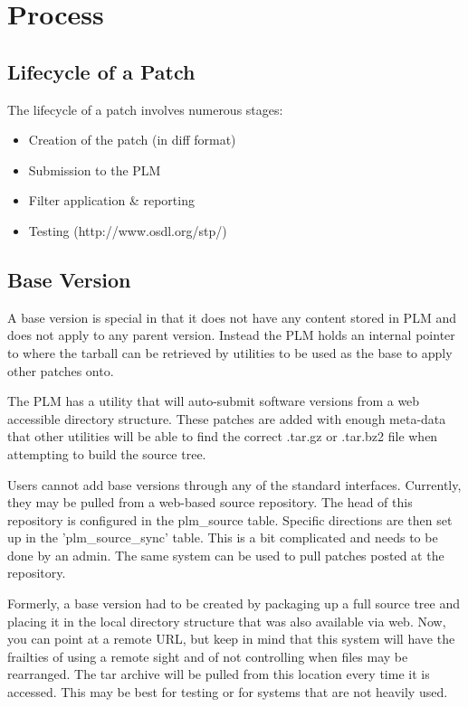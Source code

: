 \section{Process}
\subsection{Lifecycle of a Patch}
The lifecycle of a patch involves numerous stages:

\begin{itemize}
\item Creation of the patch (in diff format)
\item Submission to the PLM 
\item Filter application \& reporting
\item Testing (http://www.osdl.org/stp/)
\end{itemize}

\subsection{Base Version}
A base version is special in that it does not have any content stored in 
PLM and does not apply to any parent version.  Instead the PLM holds an 
internal pointer to where the tarball can be retrieved by utilities to be
used as the base to apply other patches onto.

The PLM has a utility that will auto-submit software versions from a web 
accessible directory structure.  These patches are added with enough 
meta-data that other utilities will be able to find the correct .tar.gz 
or .tar.bz2 file when attempting to build the source tree.

Users cannot add base versions through any of the standard interfaces.  
Currently, they may be pulled from a web-based source repository.  The 
head of this
repository is configured in the plm\_source table.  Specific directions
are then set up in the 'plm\_source\_sync' table.  This is a bit 
complicated and 
needs to be done by an admin.  The same system can be used to pull 
patches posted at the repository.

Formerly, a base version had to be created by packaging up a full source 
tree and placing it in the local directory structure that was also 
available via web.  Now, you can point at a remote URL, but keep in mind 
that this system will have the frailties of using a remote sight and 
of not controlling when files may be rearranged.  The tar archive will be 
pulled from this location every time it is accessed.  This may be best for 
testing or for systems that are not heavily used.


